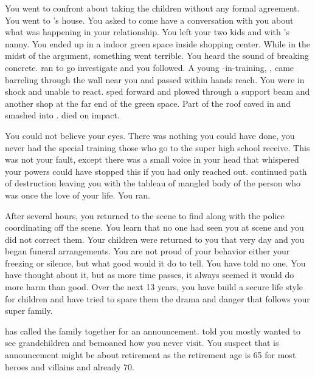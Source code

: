 \documentclass[char]{LRSguildcamp1}
\begin{document}
You went to confront \cAS{} about taking the children without any formal agreement. You went to \cOS{}'s house. You asked \cAS{} to come have a conversation with you about what was happening in your relationship. You left your two kids and \cGrad{} with \cGrad{}'s nanny. You ended up in a indoor green space inside shopping center. While in the midst of the argument, something went terrible.
You heard the sound of breaking concrete. \cAS{} ran to go investigate and you followed. A young \cJuggernaut{\hero}-in-training, \cJuggernaut{}, came barreling through the wall near you and passed within hands reach. You were in shock and unable to react.\cJuggernaut{} sped forward and plowed through a support beam and another shop at the far end of the green space. Part of the roof caved in and smashed into \cAS{}. \cAS{} died on impact. 

You could not believe your eyes. There was nothing you could have done, you never had the special training those who go to the super high school receive. This was not your fault, except there was a small voice in your head that whispered your powers could have stopped this if you had only reached out. \cJuggernaut{} continued \cJuggernaut{\their} path of destruction leaving you with the tableau of mangled body of the person who was once the love of your life. You ran. 

After several hours, you returned to the scene to find \cOS{} along with the police coordinating off the scene. You learn that no one had seen you at scene and you did not correct them. Your children were returned to you that very day and you began funeral arrangements. You are not proud of your behavior either your freezing or silence, but what good would it do to tell. You have told no one. You have thought about it, but as more time passes, it always seemed it would do more harm than good. Over the next 13 years, you have build a secure life style for children and have tried to spare them the drama and danger that follows your super family. 

\cGrandma{} has called the family together for an announcement. \cGrandma{\They} told you mostly \cGrandma{\they} wanted to see \cGrandma{\their} grandchildren and bemoaned how you never visit.  You suspect that is announcement might be about \cGrandma{\their} retirement as the retirement age is 65 for most heroes and villains and \cGrandma{\theyare} already 70.  
\end{document}
